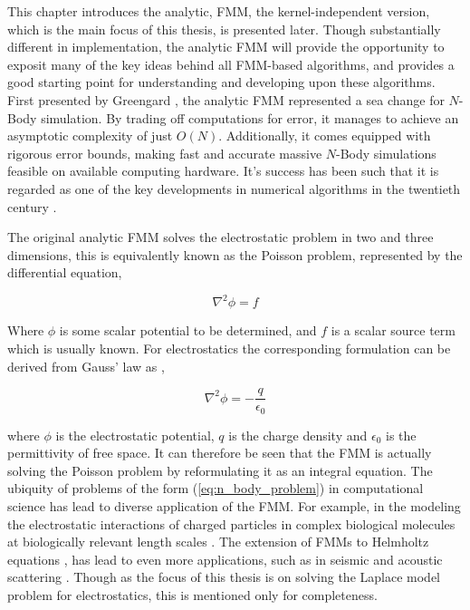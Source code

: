 This chapter introduces the analytic, \gls{FMM}, the kernel-independent
version, which is the main focus of this thesis, is presented later.
Though substantially different in implementation, the analytic FMM will provide the opportunity to exposit many of the key ideas
behind all FMM-based algorithms, and provides a good starting point for understanding
and developing upon these algorithms. First presented by Greengard \cite{Greengard:1987:Yale},
the analytic \gls{FMM} represented a sea change for $N$-Body simulation. By
trading off computations for error, it manages to achieve an asymptotic complexity
 of just $O(N)$. Additionally, it comes equipped with rigorous error bounds,
making fast and accurate massive $N$-Body simulations feasible on available
computing hardware. It's success has been such that it is regarded as one of
the key developments in numerical algorithms in the twentieth century \cite{Cipra:2000:SN}.

The original analytic FMM solves the electrostatic problem
in two and three dimensions, this is equivalently known as the Poisson problem,
represented by the differential equation,

\begin{equation}
    \nabla^2 \phi =f
\label{eq:poisson}
\end{equation}

Where $\phi$ is some scalar potential to be determined, and $f$ is a scalar source
term which is usually known. For electrostatics the corresponding formulation
can be derived from Gauss' law as \cite{Griffiths:2017:CUP},

\begin{equation}
  \nabla^2 \phi = - \frac{q}{\epsilon_0}
\label{eq:electrostatic_poisson}
\end{equation}

where $\phi$ is the electrostatic potential, $q$ is the charge density and
$\epsilon_0$ is the permittivity of free space. It can therefore be seen that
the \gls{FMM} is actually solving the Poisson problem by reformulating it as an
integral equation. The ubiquity of problems of the form (\ref{eq:n_body_problem})
in computational science has lead to diverse application of the FMM. For example,
in the modeling the electrostatic interactions of charged particles in complex
biological molecules at biologically relevant length scales \cite{Board:1992:CPL}.
The extension of FMMs to Helmholtz equations \cite{Rokhlin:1990:JCP}, has lead
to even more applications, such as in seismic and acoustic scattering
\cite{Hwu:2011:MKP}. Though as the focus of this thesis is on solving the Laplace
model problem for electrostatics, this is mentioned only for completeness.

